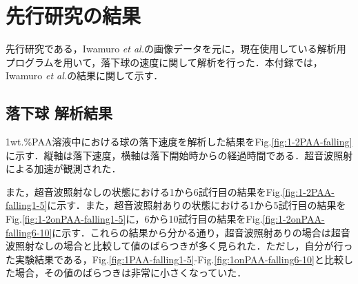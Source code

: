 \section{先行研究の結果}

先行研究である，Iwamuro {\it et al.}\cite{ref:9}の画像データを元に，現在使用している解析用プログラムを用いて，落下球の速度に関して解析を行った．本付録では，Iwamuro {\it et al.}\cite{ref:9}の結果に関して示す．

\subsection{落下球 解析結果}

1wt.\%PAA溶液中における球の落下速度を解析した結果をFig.\ref{fig:1-2PAA-falling}に示す．縦軸は落下速度，横軸は落下開始時からの経過時間である．超音波照射による加速が観測された．

また，超音波照射なしの状態における1から6試行目の結果をFig.\ref{fig:1-2PAA-falling1-5}に示す．また，超音波照射ありの状態における1から5試行目の結果をFig.\ref{fig:1-2onPAA-falling1-5}に，6から10試行目の結果をFig.\ref{fig:1-2onPAA-falling6-10}に示す．これらの結果から分かる通り，超音波照射ありの場合は超音波照射なしの場合と比較して値のばらつきが多く見られた．ただし，自分が行った実験結果である，Fig.\ref{fig:1PAA-falling1-5}-Fig.\ref{fig:1onPAA-falling6-10}と比較した場合，その値のばらつきは非常に小さくなっていた．

